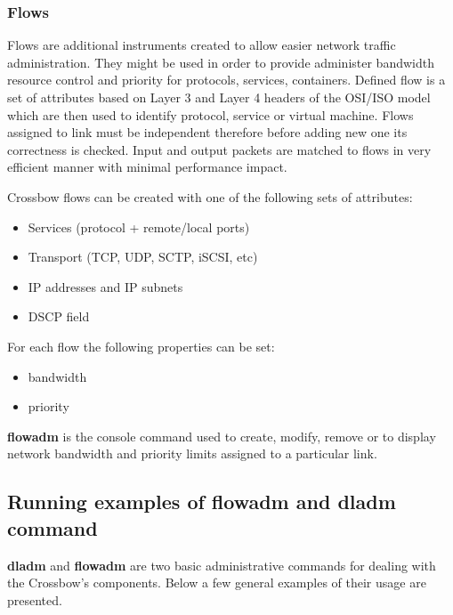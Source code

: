 \documentclass[11pt]{book}
\begin{document}
        \subsubsection{Flows}

          Flows are additional instruments created to allow easier network traffic administration. They might be used in
          order to provide administer bandwidth resource control and priority for protocols, services, containers.
          Defined flow is a set of attributes based on Layer 3 and Layer 4 headers of the OSI/ISO model which are then
          used to identify protocol, service or virtual machine.  Flows assigned to link must be independent therefore
          before adding new one its correctness is checked. Input and output packets are matched to flows in very
          efficient manner with minimal performance impact.

          \medskip

          Crossbow flows can be created with one of the following sets of attributes:

          \begin{itemize}
            \item Services (protocol + remote/local ports)
            \item Transport (TCP, UDP, SCTP, iSCSI, etc)
            \item IP addresses and IP subnets
            \item DSCP field
          \end{itemize}

          For each flow the following properties can be set: 

          \begin{itemize}
            \item bandwidth
            \item priority
          \end{itemize}

          \medskip

          \textbf{flowadm} is the console command used to create, modify, remove or to display network bandwidth and
          priority limits assigned to a particular link. 


      \subsection{Running examples of flowadm and dladm command}

        \textbf{dladm} and \textbf{flowadm} are two basic administrative commands for dealing with the Crossbow's
        components. Below a few general examples of their usage are presented.
  
\end{document}
